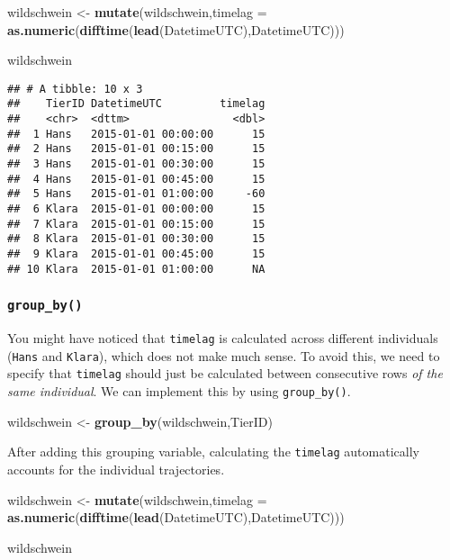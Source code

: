 \documentclass[
]{article}
\newenvironment{Shaded}{\begin{snugshade}}{\end{snugshade}}
\newcommand{\DataTypeTok}[1]{\textcolor[rgb]{0.13,0.29,0.53}{#1}}
\newcommand{\KeywordTok}[1]{\textcolor[rgb]{0.13,0.29,0.53}{\textbf{#1}}}
\newcommand{\NormalTok}[1]{#1}
\newcommand{\StringTok}[1]{\textcolor[rgb]{0.31,0.60,0.02}{#1}}
\begin{document}
\begin{Shaded}
\begin{Highlighting}[]
\NormalTok{wildschwein <-}\StringTok{ }\KeywordTok{mutate}\NormalTok{(wildschwein,}\DataTypeTok{timelag =} \KeywordTok{as.numeric}\NormalTok{(}\KeywordTok{difftime}\NormalTok{(}\KeywordTok{lead}\NormalTok{(DatetimeUTC),DatetimeUTC)))}

\NormalTok{wildschwein}
\end{Highlighting}
\end{Shaded}

\begin{verbatim}
## # A tibble: 10 x 3
##    TierID DatetimeUTC         timelag
##    <chr>  <dttm>                <dbl>
##  1 Hans   2015-01-01 00:00:00      15
##  2 Hans   2015-01-01 00:15:00      15
##  3 Hans   2015-01-01 00:30:00      15
##  4 Hans   2015-01-01 00:45:00      15
##  5 Hans   2015-01-01 01:00:00     -60
##  6 Klara  2015-01-01 00:00:00      15
##  7 Klara  2015-01-01 00:15:00      15
##  8 Klara  2015-01-01 00:30:00      15
##  9 Klara  2015-01-01 00:45:00      15
## 10 Klara  2015-01-01 01:00:00      NA
\end{verbatim}

\hypertarget{group_by}{%
\subsubsection{\texorpdfstring{\texttt{group\_by()}}{group\_by()}}\label{group_by}}

You might have noticed that \texttt{timelag} is calculated across
different individuals (\texttt{Hans} and \texttt{Klara}), which does not
make much sense. To avoid this, we need to specify that \texttt{timelag}
should just be calculated between consecutive rows \emph{of the same
individual}. We can implement this by using \texttt{group\_by()}.

\begin{Shaded}
\begin{Highlighting}[]
\NormalTok{wildschwein <-}\StringTok{ }\KeywordTok{group_by}\NormalTok{(wildschwein,TierID)}
\end{Highlighting}
\end{Shaded}

After adding this grouping variable, calculating the \texttt{timelag}
automatically accounts for the individual trajectories.

\begin{Shaded}
\begin{Highlighting}[]
\NormalTok{wildschwein <-}\StringTok{ }\KeywordTok{mutate}\NormalTok{(wildschwein,}\DataTypeTok{timelag =} \KeywordTok{as.numeric}\NormalTok{(}\KeywordTok{difftime}\NormalTok{(}\KeywordTok{lead}\NormalTok{(DatetimeUTC),DatetimeUTC)))}



\NormalTok{wildschwein}
\end{Highlighting}
\end{Shaded}
\end{document}
